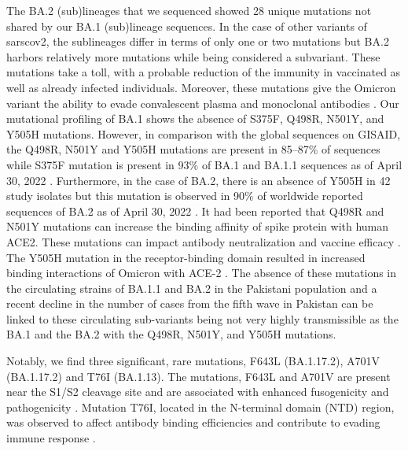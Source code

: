 The BA.2 (sub)lineages that we sequenced showed 28 unique mutations not shared by our BA.1 (sub)lineage sequences.
In the case of other variants of \gls{sarscov2}, the sublineages differ in terms of only one or two mutations but BA.2 harbors relatively more mutations while being considered a subvariant.
These mutations take a toll, with a probable reduction of the immunity in vaccinated as well as already infected individuals.
Moreover, these mutations give the Omicron variant the ability to evade convalescent plasma and monoclonal antibodies \citep{ai2022antibody, altarawneh2022effect}.
Our mutational profiling of BA.1 shows the absence of S375F, Q498R, N501Y, and Y505H mutations.
However, in comparison with the global sequences on GISAID, the Q498R, N501Y and Y505H mutations are present in 85--87\% of sequences while S375F mutation is present in 93\% of BA.1 and BA.1.1 sequences as of April 30, 2022 \citep{shu2017gisaid}.
Furthermore, in the case of BA.2, there is an absence of Y505H in 42 study isolates but this mutation is observed in 90\% of worldwide reported sequences of BA.2 as of April 30, 2022 \citep{shu2017gisaid}.
It had been reported that Q498R and N501Y mutations can increase the binding affinity of spike protein with human ACE2.
These mutations can impact antibody neutralization and vaccine efficacy \citep{schubert2022human}.
The Y505H mutation in the receptor-binding domain resulted in increased binding interactions of Omicron with ACE-2 \citep{ortega2021Omicron}.
The absence of these mutations in the circulating strains of BA.1.1 and BA.2 in the Pakistani population and a recent decline in the number of cases from the fifth wave in Pakistan can be linked to these circulating sub-variants being not
very highly transmissible as the BA.1 and the BA.2 with the Q498R, N501Y, and Y505H mutations.

Notably, we find three significant, rare mutations, F643L (BA.1.17.2), A701V (BA.1.17.2) and T76I (BA.1.13).
The mutations, F643L and A701V are present near the S1/S2 cleavage site and are associated with enhanced fusogenicity and pathogenicity \citep{saito2022enhanced}.
Mutation T76I, located in the N-terminal domain (NTD) region, was observed to affect antibody binding efficiencies and contribute to evading immune response \citep{ou2022tracking}.

